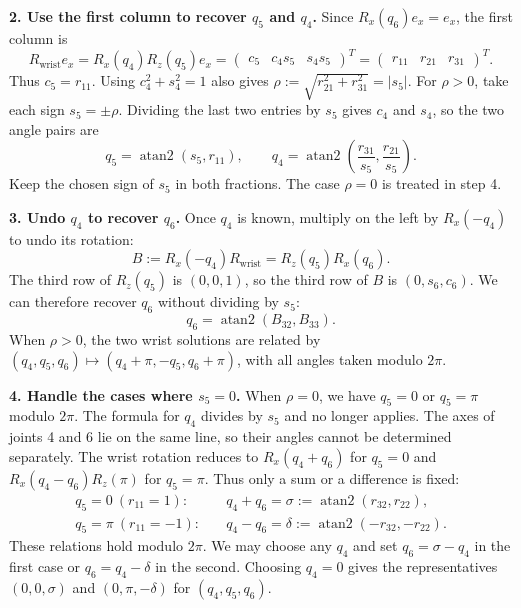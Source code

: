 \textbf{2. Use the first column to recover $q_5$ and $q_4$.}
Since $R_x(q_6)e_x=e_x$, the first column is
\begin{equation}
 R_{\text{wrist}}e_x
 =R_x(q_4)R_z(q_5)e_x
 =\begin{pmatrix}c_5&c_4s_5&s_4s_5\end{pmatrix}^T
 =\begin{pmatrix}r_{11}&r_{21}&r_{31}\end{pmatrix}^T.
 \label{eq:ik-wrist-first-column}
\end{equation}
Thus $c_5=r_{11}$. Using $c_4^2+s_4^2=1$ also gives
$\rho:=\sqrt{r_{21}^2+r_{31}^2}=|s_5|$.
For $\rho>0$, take each sign $s_5=\pm\rho$. Dividing the last two entries
by $s_5$ gives $c_4$ and $s_4$, so the two angle pairs are
\begin{equation}
 q_5=\operatorname{atan2}(s_5,r_{11}),\qquad
 q_4=\operatorname{atan2}\!\left(\frac{r_{31}}{s_5},
                               \frac{r_{21}}{s_5}\right).
 \label{eq:ik-wrist-q45}
\end{equation}
Keep the chosen sign of $s_5$ in both fractions.
The case $\rho=0$ is treated in step 4.

\textbf{3. Undo $q_4$ to recover $q_6$.}
Once $q_4$ is known, multiply on the left by $R_x(-q_4)$ to undo its rotation:
\begin{equation}
 B:=R_x(-q_4)R_{\text{wrist}}=R_z(q_5)R_x(q_6).
 \label{eq:ik-wrist-remainder}
\end{equation}
The third row of $R_z(q_5)$ is $(0,0,1)$, so the third row of $B$ is
$(0,s_6,c_6)$. We can therefore recover $q_6$ without dividing by $s_5$:
\begin{equation}
 q_6=\operatorname{atan2}(B_{32},B_{33}).
 \label{eq:ik-wrist-q6}
\end{equation}
When $\rho>0$, the two wrist solutions are related by
$(q_4,q_5,q_6)\mapsto(q_4+\pi,-q_5,q_6+\pi)$, with all angles taken modulo $2\pi$.

\textbf{4. Handle the cases where $s_5=0$.}
When $\rho=0$, we have $q_5=0$ or $q_5=\pi$ modulo $2\pi$.
The formula for $q_4$ divides by $s_5$ and no longer applies. The axes of
joints 4 and 6 lie on the same line, so their angles cannot be determined
separately. The wrist rotation reduces to $R_x(q_4+q_6)$ for $q_5=0$ and
$R_x(q_4-q_6)R_z(\pi)$ for $q_5=\pi$. Thus only a sum or a difference is fixed:
\begin{equation}
 \begin{aligned}
 q_5=0\ (r_{11}=1):\quad
 &q_4+q_6=\sigma:=\operatorname{atan2}(r_{32},r_{22}),\\
 q_5=\pi\ (r_{11}=-1):\quad
 &q_4-q_6=\delta:=\operatorname{atan2}(-r_{32},-r_{22}).
 \end{aligned}
 \label{eq:ik-wrist-singular}
\end{equation}
These relations hold modulo $2\pi$. We may choose any $q_4$ and set
$q_6=\sigma-q_4$ in the first case or $q_6=q_4-\delta$ in the second.
Choosing $q_4=0$ gives the representatives $(0,0,\sigma)$ and $(0,\pi,-\delta)$
for $(q_4,q_5,q_6)$.

